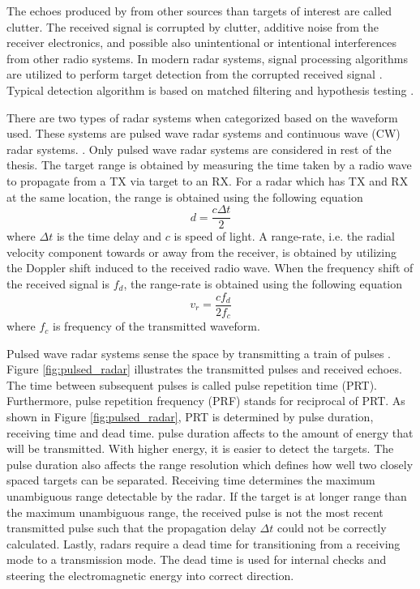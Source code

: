 \documentclass[english, 12pt, a4paper, elec, utf8, a-1b, online]{aaltothesis}
\newcommand{\dt}{\Delta t}
\begin{document}
The echoes produced by from other sources than targets of interest are called clutter.
The received signal is corrupted by clutter, additive noise from the receiver electronics, and possible also unintentional or intentional interferences from other radio systems.
In modern radar systems, signal processing algorithms are utilized to perform target detection from the corrupted received signal \cite{Mahafza2015}.
Typical detection algorithm is based on matched filtering and hypothesis testing \cite{Mahafza2015}.

There are two types of radar systems when categorized based on the waveform used.
These systems are pulsed wave radar systems and continuous wave (CW) radar systems.  \cite{Mahafza2015}.
Only pulsed wave radar systems are considered in rest of the thesis.
The target range is obtained by measuring the time taken by a radio wave to propagate from a TX via target to an RX.
For a radar which has TX and RX at the same location, the range is obtained using the following equation \cite{Curry2011}
\begin{equation}
    d = \frac{ c\dt}{2} 
\end{equation}
where $\dt$ is the time delay and $c$ is speed of light.
A range-rate, i.e. the radial velocity component towards or away from the receiver, is obtained by utilizing the Doppler shift induced to the received radio wave.
When the frequency shift of the received signal is $f_d$, the range-rate is obtained using the following equation \cite{Curry2011}
\begin{equation}
    v_r = \frac{cf_d}{2f_c}
\end{equation}
where $f_c$ is frequency of the transmitted waveform.


Pulsed wave radar systems sense the space by transmitting a train of pulses \cite{Mahafza2015}.
Figure \ref{fig:pulsed_radar} illustrates the transmitted pulses and received echoes.
The time between subsequent pulses is called pulse repetition time (PRT). 
Furthermore, pulse repetition frequency (PRF) stands for reciprocal of PRT.
As shown in Figure \ref{fig:pulsed_radar}, PRT is determined by pulse duration, receiving time and dead time.
pulse duration affects to the amount of energy that will be transmitted.
With higher energy, it is easier to detect the targets.
The pulse duration also affects the range resolution which defines how well two closely spaced targets can be separated.
Receiving time determines the maximum unambiguous range detectable by the radar.
If the target is at longer range than the maximum unambiguous range, the received pulse is not the most recent transmitted pulse such that the propagation delay $\dt$ could not be correctly calculated.
Lastly, radars require a dead time for transitioning from a receiving mode to a transmission mode.
The dead time is used for internal checks and steering the electromagnetic energy into correct direction.
\end{document}
